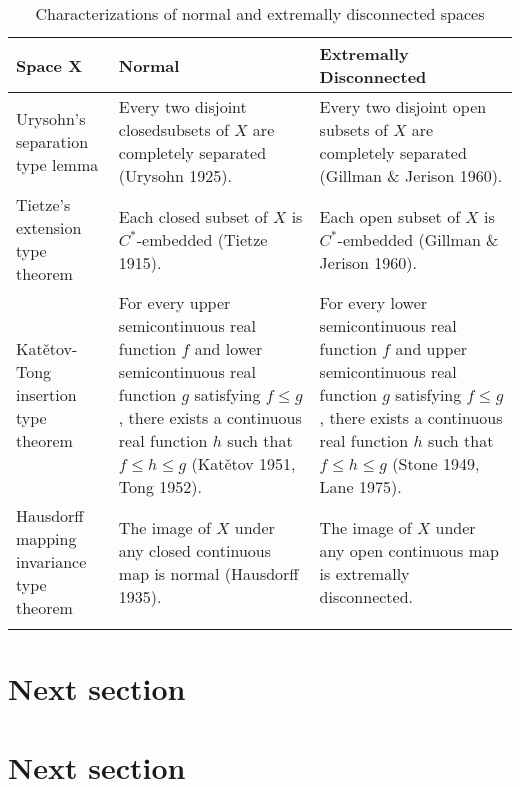 \begin{table}
\caption{Characterizations of normal and extremally disconnected spaces}
\label{table1}
\begin{center}
\begin{tabular}{p{91pt}p{150pt}p{155pt}}
\toprule[1.2pt]   {\bf Space $\boldsymbol{X}$} &   {\sc Normal} &
{\sc Extremally Disconnected}  \\
\bottomrule[1.2pt]
\addlinespace[5pt]
\raggedright {\sf Urysohn's separation type lemma} & \raggedright Every two disjoint {\sc closed}\break subsets of $X$ are completely separated (Urysohn 1925). & \raggedright Every two disjoint {\sc open} subsets of $X$ are completely separated (Gillman \& Jerison 1960).\tabularnewline
\addlinespace[5pt]\midrule\addlinespace[5pt]
\raggedright {\sf Tietze's extension type theorem} & \raggedright Each {\sc closed} subset of $X$ is $C^*$-embedded (Tietze 1915). & \raggedright Each {\sc open} subset of $X$ is $C^*$-embedded (Gillman \& Jerison 1960). \tabularnewline
\addlinespace[5pt]\midrule\addlinespace[5pt]
\raggedright {\sf Kat\v{e}tov-Tong insertion type theorem} & For every {\sc upper} sem\-i\-con\-tin\-u\-ous real function $f$ and {\sc lower} sem\-i\-con\-tin\-u\-ous real function $g$ satisfying $f\le g$, there exists a continuous real function $h$ such that $f\le h\le g$ (Kat\v{e}tov 1951, Tong 1952). & For every {\sc lower} sem\-i\-con\-tin\-u\-ous real function $f$ and {\sc upper} sem\-i\-con\-tin\-u\-ous real function $g$ satisfying $f\le g$, there exists a continuous real function $h$ such that $f\le h\le g$ (Stone 1949, Lane 1975).\\
\addlinespace[5pt]\midrule\addlinespace[5pt]
\raggedright {\sf Hausdorff mapping invariance type theorem} & \raggedright The image of $X$ under any  {\sc closed} continuous map is {\sc normal} (Hausdorff 1935). & \raggedright
The image of $X$ under any {\sc open} continuous map is {\sc extremally disconnected}. \tabularnewline
\addlinespace[5pt]\bottomrule[1.2pt]
\end{tabular}
\end{center}
\end{table}

\section{Next section}

\section{Next section}


